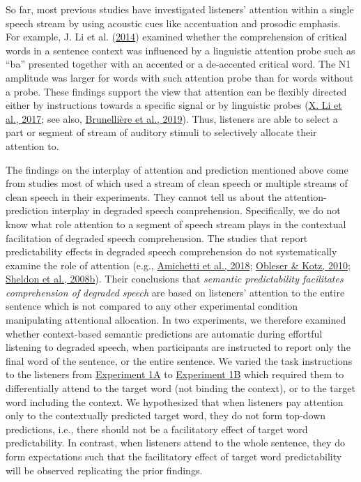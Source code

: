 \documentclass[a4paper, nobind]{templates/ociamthesis}
\begin{document}
So far, most previous studies have investigated listeners' attention within a single speech stream by using acoustic cues like accentuation and prosodic emphasis.
For example, J. Li et al. (\protect\hyperlink{ref-Li2014}{2014}) examined whether the comprehension of critical words in a sentence context was influenced by a linguistic attention probe such as ``ba'' presented together with an accented or a de-accented critical word.
The N1 amplitude was larger for words with such attention probe than for words without a probe.
These findings support the view that attention can be flexibly directed either by instructions towards a specific signal or by linguistic probes (\protect\hyperlink{ref-Li2017}{X. Li et al., 2017}; see also, \protect\hyperlink{ref-Brunelliere2019}{Brunellière et al., 2019}).
Thus, listeners are able to select a part or segment of stream of auditory stimuli to selectively allocate their attention to.

The findings on the interplay of attention and prediction mentioned above come from studies most of which used a stream of clean speech or multiple streams of clean speech in their experiments.
They cannot tell us about the attention-prediction interplay in degraded speech comprehension.
Specifically, we do not know what role attention to a segment of speech stream plays in the contextual facilitation of degraded speech comprehension.
The studies that report predictability effects in degraded speech comprehension do not systematically examine the role of attention (e.g., \protect\hyperlink{ref-Amichetti2018}{Amichetti et al., 2018}; \protect\hyperlink{ref-Obleser2010}{Obleser \& Kotz, 2010}; \protect\hyperlink{ref-Sheldon2008b}{Sheldon et al., 2008b}).
Their conclusions that \emph{semantic predictability facilitates comprehension of degraded speech} are based on listeners' attention to the entire sentence
which is not compared to any other experimental condition manipulating attentional allocation.
In two experiments, we therefore examined whether context-based semantic predictions are automatic during effortful listening to degraded speech, when participants are instructed to report only the final word of the sentence, or the entire sentence.
We varied the task instructions to the listeners from \protect\hyperlink{experiment1a}{Experiment 1A} to \protect\hyperlink{experiment1b}{Experiment 1B} which required them to differentially attend to the target word (not binding the context), or to the target word including the context.
We hypothesized that when listeners pay attention only to the contextually predicted target word, they do not form top-down predictions, i.e., there should not be a facilitatory effect of target word predictability.
In contrast, when listeners attend to the whole sentence, they do form expectations such that the facilitatory effect of target word predictability will be observed replicating the prior findings.
\end{document}
